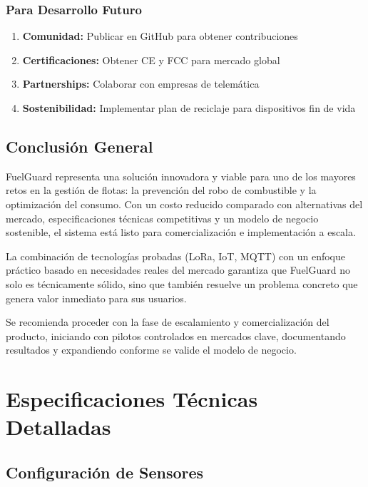 \documentclass[12pt,a4paper,oneside]{report}
\begin{document}
\subsection{Para Desarrollo Futuro}

\begin{enumerate}
    \item \textbf{Comunidad:} Publicar en GitHub para obtener contribuciones
    
    \item \textbf{Certificaciones:} Obtener CE y FCC para mercado global
    
    \item \textbf{Partnerships:} Colaborar con empresas de telemática
    
    \item \textbf{Sostenibilidad:} Implementar plan de reciclaje para dispositivos fin de vida
\end{enumerate}

\section{Conclusión General}

FuelGuard representa una solución innovadora y viable para uno de los mayores retos en la gestión de flotas: la prevención del robo de combustible y la optimización del consumo. Con un costo reducido comparado con alternativas del mercado, especificaciones técnicas competitivas y un modelo de negocio sostenible, el sistema está listo para comercialización e implementación a escala.

La combinación de tecnologías probadas (LoRa, IoT, MQTT) con un enfoque práctico basado en necesidades reales del mercado garantiza que FuelGuard no solo es técnicamente sólido, sino que también resuelve un problema concreto que genera valor inmediato para sus usuarios.

Se recomienda proceder con la fase de escalamiento y comercialización del producto, iniciando con pilotos controlados en mercados clave, documentando resultados y expandiendo conforme se valide el modelo de negocio.

\appendix

\chapter{Especificaciones Técnicas Detalladas}

\section{Configuración de Sensores}
\end{document}

